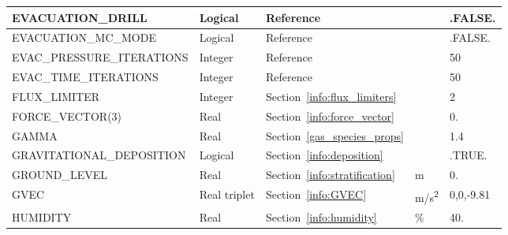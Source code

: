 \documentclass[11pt]{book}
\begin{document}
\begin{longtable}{@{\extracolsep{\fill}}|l|l|l|l|l|}
{\ct EVACUATION\_DRILL}                         & Logical       & Reference~\cite{FDS_Evac_Users_Guide}                 &               & {\ct .FALSE.}     \\ \hline
{\ct EVACUATION\_MC\_MODE}                      & Logical       & Reference~\cite{FDS_Evac_Users_Guide}                 &               & {\ct .FALSE.}     \\ \hline
{\ct EVAC\_PRESSURE\_ITERATIONS}                & Integer       & Reference~\cite{FDS_Evac_Users_Guide}                 &               & 50                \\ \hline
{\ct EVAC\_TIME\_ITERATIONS}                    & Integer       & Reference~\cite{FDS_Evac_Users_Guide}                 &               & 50                \\ \hline
{\ct FLUX\_LIMITER}                             & Integer       & Section~\ref{info:flux_limiters}                      &               & 2                 \\ \hline
{\ct FORCE\_VECTOR(3)}                          & Real          & Section~\ref{info:force_vector}                       &               & 0.                \\ \hline
{\ct GAMMA}                                     & Real          & Section~\ref{gas_species_props}                       &               & 1.4               \\ \hline
{\ct GRAVITATIONAL\_DEPOSITION}                 & Logical       & Section~\ref{info:deposition}                         &               & {\ct .TRUE.}      \\ \hline
{\ct GROUND\_LEVEL}                             & Real          & Section~\ref{info:stratification}                     & m             & 0.                \\ \hline
{\ct GVEC}                                      & Real triplet  & Section~\ref{info:GVEC}                               & \si{m/s^2}    & 0,0,-9.81         \\ \hline
{\ct HUMIDITY}                                  & Real          & Section~\ref{info:humidity}                           & \%            & 40.               \\ \hline

\end{longtable}
\end{document}
